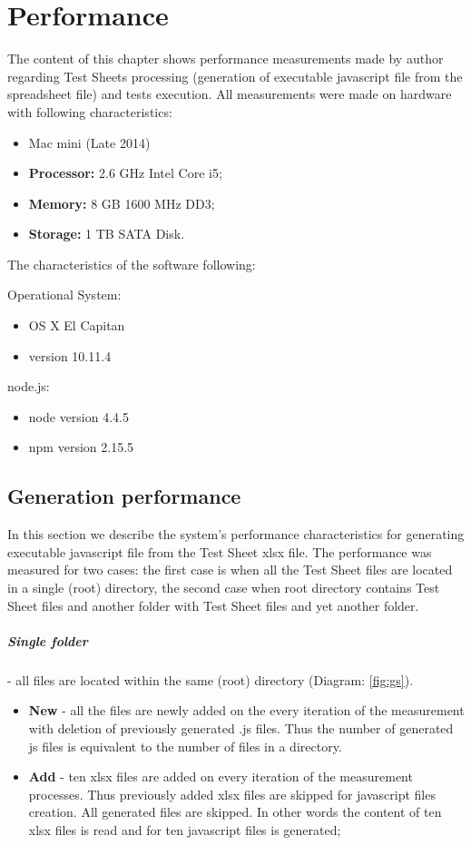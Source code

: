 \chapter{Performance}
\label{chap:perfux}
The content of this chapter shows performance measurements made by author regarding Test Sheets processing (generation of executable javascript file from the spreadsheet file) and tests execution.  
All measurements were made on hardware with following characteristics:
\begin{itemize}
	\item Mac mini (Late 2014)
	\item \textbf{Processor:} 2.6 GHz Intel Core i5;
	\item \textbf{Memory:} 8 GB 1600 MHz DD3;
	\item \textbf{Storage:}  1 TB SATA Disk.
\end{itemize}

The characteristics of the software following:

Operational System:
\begin{itemize}
	\item OS X El Capitan
	\item version 10.11.4
\end{itemize}

node.js:
\begin{itemize}
	\item node version 4.4.5
	\item npm version 2.15.5
\end{itemize}


\section{Generation performance}
In this section we describe the system's performance characteristics for generating executable javascript file from the Test Sheet xlsx file. The performance was measured for two cases: the first case is when all the Test Sheet files are located in a single (root) directory, the second case when root directory contains Test Sheet files and another folder with Test Sheet files and yet another folder.
\paragraph{Single folder} - all files are located within the same (root) directory (Diagram: \ref{fig:gs}).
\begin{itemize}
	\item \textbf{New} - all the files are newly added on the every iteration of the measurement with deletion of previously generated .js files. Thus the number of generated js files is equivalent to the number of files in a directory.
	\item \textbf{Add} - ten xlsx files are added on every iteration of the measurement processes. Thus previously added xlsx files are skipped for javascript files creation. All generated files are skipped. In other words the content of ten xlsx files is read and for ten javascript files is generated;
\end{itemize}



